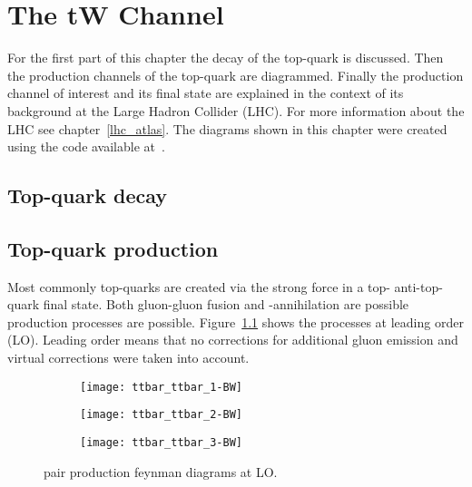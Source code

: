 \chapter{The tW Channel}
\label{chp:tw}

For the first part of this chapter the decay of the top-quark is discussed. Then the production channels of the top-quark are diagrammed. Finally the production channel of interest and its final state are explained in the context of its background at the Large Hadron Collider (LHC). For more information about the LHC see chapter~\ref{lhc_atlas}.
The diagrams shown in this chapter were created using the code available at~\cite{feyn_repo}.

\section{Top-quark decay}


\section{Top-quark production}

Most commonly top-quarks are created via the strong force in a top- anti-top-quark final state. Both gluon-gluon fusion and \Pquark\APquark-annihilation are possible production processes are possible. Figure~\ref{fig:ttpairLO} shows the processes at leading order (LO). Leading order means that no corrections for additional gluon emission and virtual corrections were taken into account.

\begin{figure}[htbp]
  \begin{subfigure}[b]{0.3\textwidth}
  	\centering
    \texttt{[image: ttbar\_ttbar\_1-BW]}
  \end{subfigure}
  \quad
  \begin{subfigure}[b]{0.3\textwidth}
  	\centering
    \texttt{[image: ttbar\_ttbar\_2-BW]}
  \end{subfigure}
  \quad
  \begin{subfigure}[b]{0.3\textwidth}
  	\centering
    \texttt{[image: ttbar\_ttbar\_3-BW]}
  \end{subfigure} 
  \caption[\ttbar pair production feynman diagrams at LO]{\ttbar pair production feynman diagrams at LO.}
  \label{fig:ttpairLO}
\end{figure}

